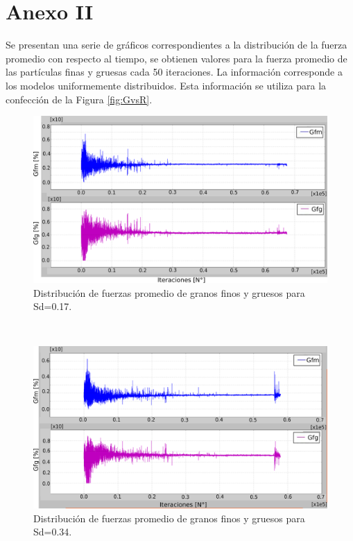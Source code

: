 \chapter*{ Anexo II} 

Se presentan una serie de gr\'aficos correspondientes a la distribuci\'on de la fuerza promedio con respecto al tiempo, se obtienen valores para la fuerza promedio de las part\'iculas finas y gruesas cada 50 iteraciones. La informaci\'on corresponde a los modelos uniformemente distribuidos. Esta informaci\'on se utiliza para la confecci\'on de la Figura \ref{fig:GvsR}. \\ 

\begin{figure}[H]
\centering
\includegraphics[width=\textwidth]{Anexo1/PSD17}
\caption{Distribuci\'on de fuerzas promedio de granos finos y gruesos para Sd=0.17.}
\label{fig:PSD17}
\end{figure}\\


\begin{figure}[H]
\centering
\includegraphics[width=\textwidth]{Anexo1/PSD34}
\caption{Distribuci\'on de fuerzas promedio de granos finos y gruesos para Sd=0.34.}
\label{fig:PSD34}
\end{figure}\\


